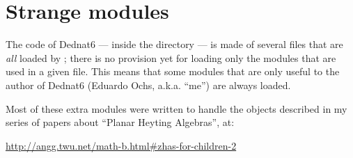 \documentclass[oneside]{article}
\def\msk{\medskip}
\begin{document}
%
\section{Strange modules}


The code of Dednat6 --- inside the directory  --- is made
of several  files that are {\sl all} loaded by
; there is no provision yet for loading only the
modules that are used in a given  file. This means that some
modules that are only useful to the author of Dednat6 (Eduardo Ochs,
a.k.a. ``me'') are always loaded.

Most of these extra modules were written to handle the objects
described in my series of papers about ``Planar Heyting Algebras'',
at:

\url{http://angg.twu.net/math-b.html#zhas-for-children-2}

\msk

\def\defzha#1#2{\expandafter\def\csname zha-#1\endcsname{#2}}
\def\ifzhaundefined#1{\expandafter\ifx\csname zha-#1\endcsname\relax}
\def\zha#1{\ifzhaundefined{#1}
    \errmessage{UNDEFINED ZHA: #1}
  \else
    \csname zha-#1\endcsname
  \fi
}
\def\deftcg#1#2{\expandafter\def\csname tcg-#1\endcsname{#2}}
\def\iftcgundefined#1{\expandafter\ifx\csname tcg-#1\endcsname\relax}
\def\tcg#1{\iftcgundefined{#1}
    \errmessage{UNDEFINED TCG: #1}
  \else
    \csname tcg-#1\endcsname
  \fi
}

%
\pu
\end{document}
